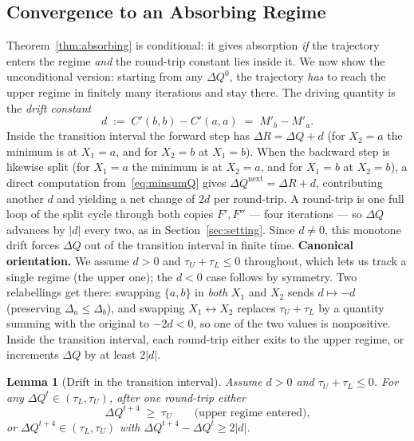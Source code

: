 \documentclass[letterpaper]{article} %
\newtheorem{lemma}[theorem]{Lemma}
\theoremstyle{definition}
\theoremstyle{remark}
\begin{document}
\subsection{Convergence to an Absorbing Regime}\label{sec:convergence}
Theorem~\ref{thm:absorbing} is conditional: it gives absorption \emph{if} the trajectory enters the regime \emph{and} the round-trip constant lies inside it.  We now show the unconditional version: starting from any $\Delta Q^0$, the trajectory \emph{has} to reach the upper regime in finitely many iterations and stay there.
The driving quantity is the \emph{drift constant}
\[
    d \;:=\; C'(b,b) - C'(a,a) \;=\; M'_b - M'_a.
\]
Inside the transition interval the forward step has $\Delta R = \Delta Q + d$ (for $X_2=a$ the minimum is at $X_1=a$, and for $X_2=b$ at $X_1=b$).  When the backward step is likewise split (for $X_1=a$ the minimum is at $X_2=a$, and for $X_1=b$ at $X_2=b$), a direct computation from~\eqref{eq:minsumQ} gives $\Delta Q^{\text{next}} = \Delta R + d$, contributing another $d$ and yielding a net change of $2d$ per round-trip.  A round-trip is one full loop of the split cycle through both copies $F', F''$ --- four iterations --- so $\Delta Q$ advances by $|d|$ every two, as in Section~\ref{sec:setting}.  Since $d \neq 0$, this monotone drift forces $\Delta Q$ out of the transition interval in finite time.
\textbf{Canonical orientation.}  We assume $d > 0$ and $\tau_U + \tau_L \leq 0$ throughout, which lets us track a single regime (the upper one); the $d < 0$ case follows by symmetry.  Two relabellings get there: swapping $\{a, b\}$ in \emph{both} $X_1$ and $X_2$ sends $d \mapsto -d$ (preserving $\Delta_a \leq \Delta_b$), and swapping $X_1 \leftrightarrow X_2$ replaces $\tau_U + \tau_L$ by a quantity summing with the original to $-2d < 0$, so one of the two values is nonpositive.
Inside the transition interval, each round-trip either exits to the upper regime, or increments $\Delta Q$ by at least $2|d|$.
\begin{lemma}[Drift in the transition interval]\label{lem:drift}
Assume $d > 0$ and $\tau_U + \tau_L \leq 0$.  For any $\Delta Q^t \in (\tau_L, \tau_U)$, after one round-trip either
\[
    \Delta Q^{t+4} \;\geq\; \tau_U \qquad\text{(upper regime entered),}
\]
or $\Delta Q^{t+4} \in (\tau_L, \tau_U)$ with $\Delta Q^{t+4} - \Delta Q^t \geq 2|d|$.
\end{lemma}
\end{document}
